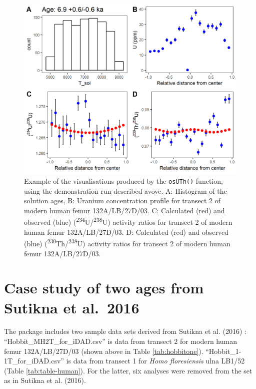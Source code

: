 \documentclass[]{elsarticle} %
\begin{document}
\begin{figure}
\includegraphics[width=0.95\linewidth]{figures/demo-panel-fig} \caption{Example of the visualisations produced by the \texttt{osUTh()} function, using the demonstration run described avove. A: Histogram of the solution ages, B: Uranium concentration profile for transect 2 of modern human femur 132A/LB/27D/03. C: Calculated (red) and observed (blue) (\textsuperscript{234}U/\textsuperscript{238}U) activity ratios for transect 2 of modern human femur 132A/LB/27D/03. D: Calculated (red) and observed (blue) (\textsuperscript{230}Th/\textsuperscript{238}U) activity ratios for transect 2 of modern human femur 132A/LB/27D/03.}\label{fig:demopanelfig}
\end{figure}

\FloatBarrier

\newpage

\hypertarget{case-study-of-two-ages-from-sutikna-et-al.2016}{%
\section{Case study of two ages from Sutikna et al.~2016}\label{case-study-of-two-ages-from-sutikna-et-al.2016}}

The package includes two sample data sets derived from Sutikna et al. (2016) : ``Hobbit\_MH2T\_for\_iDAD.csv'' is data from transect 2 for modern human femur 132A/LB/27D/03 (shown above in Table \ref{tab:hobbitone}). ``Hobbit\_1-1T\_for\_iDAD.csv'' is data from transect 1 for \emph{Homo floresiensis} ulna LB1/52 (Table \ref{tab:table-human}). For the latter, six analyses were removed from the set as in Sutikna et al. (2016).
\end{document}
